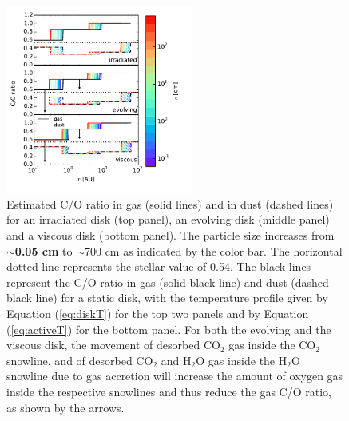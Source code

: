 \documentclass[apj]{emulateapj}
\begin{document}
\begin{figure}[h!]
\centering
\includegraphics[width=0.55\textwidth]{C_O_ratio_passive_active_disk_many_colorbar_complete_new2.pdf}
\caption{Estimated C/O ratio in gas (solid lines) and in dust (dashed lines) for an irradiated disk (top panel), an evolving disk (middle panel) and a viscous disk (bottom panel).
The particle size increases from \textbf{$\sim$0.05 cm} to $\sim$700 cm as indicated by the color bar. The horizontal dotted line represents the stellar value of 0.54. The black lines represent the C/O ratio in gas (solid black line) and dust (dashed black line) for a static disk, with the temperature profile given by Equation (\ref{eq:diskT}) for the top two panels and by Equation (\ref{eq:activeT}) for the bottom panel. 
For both the evolving and the viscous disk, the movement of desorbed CO$_2$ gas inside the CO$_2$ snowline, and of desorbed CO$_2$ and H$_2$O gas inside the H$_2$O snowline due to gas accretion will increase the amount of oxygen gas inside the respective snowlines and thus reduce the gas C/O ratio, as shown by the arrows.}
\label{fig:CO_ratio}
\end{figure}
\end{document}

